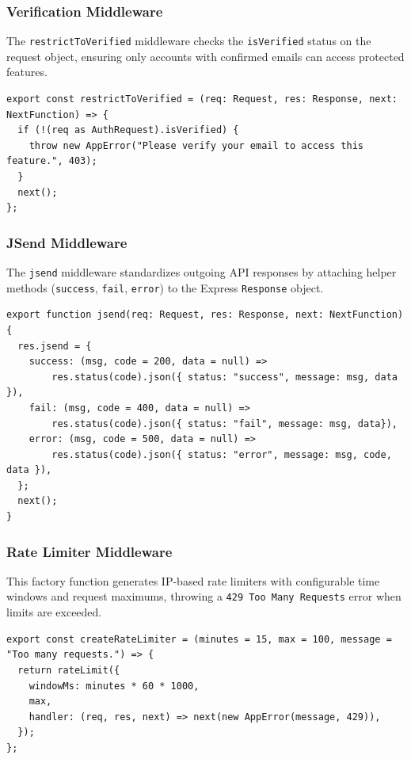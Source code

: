 \subsubsection{Verification Middleware}
The \texttt{restrictToVerified} middleware checks the \texttt{isVerified} status on the request object, ensuring only accounts with confirmed emails can access protected features.

\begin{lstlisting}
export const restrictToVerified = (req: Request, res: Response, next: NextFunction) => {
  if (!(req as AuthRequest).isVerified) {
    throw new AppError("Please verify your email to access this feature.", 403);
  }
  next();
};
\end{lstlisting}

\subsubsection{JSend Middleware}
The \texttt{jsend} middleware standardizes outgoing API responses by attaching helper methods (\texttt{success}, \texttt{fail}, \texttt{error}) to the Express \texttt{Response} object.

\begin{lstlisting}
export function jsend(req: Request, res: Response, next: NextFunction) {
  res.jsend = {
    success: (msg, code = 200, data = null) => 
        res.status(code).json({ status: "success", message: msg, data }),
    fail: (msg, code = 400, data = null) => 
        res.status(code).json({ status: "fail", message: msg, data}),
    error: (msg, code = 500, data = null) => 
        res.status(code).json({ status: "error", message: msg, code, data }),
  };
  next();
}
\end{lstlisting}

\subsubsection{Rate Limiter Middleware}
This factory function generates IP-based rate limiters with configurable time windows and request maximums, throwing a \texttt{429 Too Many Requests} error when limits are exceeded.

\begin{lstlisting}
export const createRateLimiter = (minutes = 15, max = 100, message = "Too many requests.") => {
  return rateLimit({
    windowMs: minutes * 60 * 1000,
    max,
    handler: (req, res, next) => next(new AppError(message, 429)),
  });
};
\end{lstlisting}

